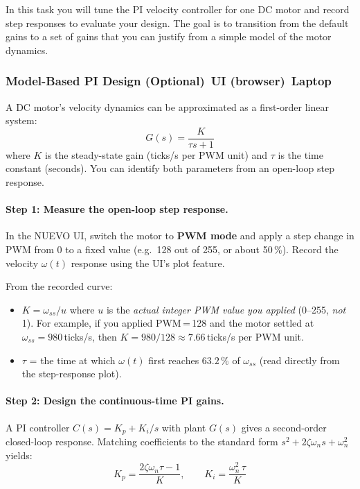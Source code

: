 \documentclass{ol-softwaremanual}
\newcommand{\onlaptop}{%
  \,\colorbox{green!25}{\footnotesize\sffamily\bfseries Laptop}}
\newcommand{\onui}{%
  \,\colorbox{yellow!50}{\footnotesize\sffamily\bfseries UI (browser)}}
\begin{document}
In this task you will tune the PI velocity controller for one DC motor and record
step responses to evaluate your design.
The goal is to transition from the default gains to a set of gains that you can
justify from a simple model of the motor dynamics.

\subsubsection{Model-Based PI Design (Optional)\onui\onlaptop}\label{ssec:model-pi}

A DC motor's velocity dynamics can be approximated as a first-order linear system:
\begin{equation}
  G(s) = \frac{K}{\tau s + 1}
  \label{eq:motor_model}
\end{equation}
where $K$ is the steady-state gain (ticks/s per PWM unit) and $\tau$ is the time
constant (seconds).
You can identify both parameters from an open-loop step response.

\paragraph{Step 1: Measure the open-loop step response.}
In the NUEVO UI, switch the motor to \textbf{PWM mode} and apply a step change in
PWM from 0 to a fixed value (e.g.\ 128 out of 255, or about 50\,\%).
Record the velocity $\omega(t)$ response using the UI's plot feature.

From the recorded curve:
\begin{itemize}
  \item $K = \omega_{ss} / u$ \quad where $u$ is the \emph{actual integer PWM value you
        applied} (0--255, \emph{not} 1).
        For example, if you applied PWM\,=\,128 and the motor settled at
        $\omega_{ss} = 980$\,ticks/s, then $K = 980/128 \approx 7.66$\,ticks/s per PWM
        unit.
  \item $\tau$ = the time at which $\omega(t)$ first reaches $63.2\,\%$ of $\omega_{ss}$
        (read directly from the step-response plot).
\end{itemize}

\paragraph{Step 2: Design the continuous-time PI gains.}
A PI controller $C(s) = K_p + K_i/s$ with plant $G(s)$ gives a second-order
closed-loop response.
Matching coefficients to the standard form $s^2 + 2\zeta\omega_n s + \omega_n^2$
yields:
\begin{equation}
  K_p = \frac{2\zeta\omega_n\tau - 1}{K}, \qquad
  K_i = \frac{\omega_n^2 \,\tau}{K}
  \label{eq:pi_gains}
\end{equation}
\end{document}
